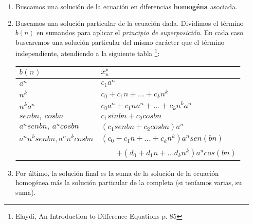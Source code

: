 \documentclass[10pt,a4paper,landscape]{article}
\begin{document}
\begin{multicols}{3}
  \begin{enumerate}
  \item Buscamos una solución de la ecuación en diferencias \textbf{homogéna}
    asociada.
  \item  Buscamos una solución particular de la ecuación dada. Dividimos el
    término $b(n)$ en sumandos para aplicar el \textit{principio de
      superposición}. En cada caso buscaremos una solución particular del mismo
    carácter que el término independiente, atendiendo a la siguiente tabla
    \footnote{Elaydi, An Introduction to Difference Equations p. 85}:
    \begin{tabular}{@{}ll@{}}
      $b(n)$    & $x_n^p$ \\ \hline
      $a^n$ & $c_1a^n$ \\
      $n^k$ & $c_0+c_1n + \hdots + c_kn^k$ \\
      $n^ka^n$ & $c_0a^n + c_1na^n + \hdots + c_kn^ka^n$ \\
      $sen bn, \ cos bn$ & $c_1 sin bn + c_2 cos bn$ \\
      $a^nsen bn, \ a^n cos bn$ & $(c_1 sen bn + c_2 cos bn)a^n$ \\
      $a^nn^k sen bn, a^nn^k cos bn$ & $(c_0 + c_1n + \hdots + c_kn^k)a^n
                                       sen(bn)$ \\
      \ & \ \ \ \ $+ (d_0 + d_1n + \hdots d_kn^k)a^n cos(bn)$
    \end{tabular}
  \item Por último, la solución final es la suma de la solución de la ecuación
    homogénea más la solución particular de la completa (si teníamos varias, su suma).
  \end{enumerate}
  

\end{multicols}
\end{document}
